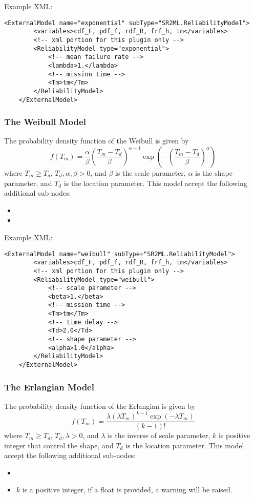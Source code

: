 Example XML:
\begin{lstlisting}[style=XML]
	<ExternalModel name="exponential" subType="SR2ML.ReliabilityModel">
		<variables>cdf_F, pdf_f, rdf_R, frf_h, tm</variables>
		<!-- xml portion for this plugin only -->
		<ReliabilityModel type="exponential">
			<!-- mean failure rate -->
			<lambda>1.</lambda>
			<!-- mission time -->
			<Tm>tm</Tm>
		</ReliabilityModel>
	</ExternalModel>
\end{lstlisting}

\subsubsection{The Weibull Model}
The probability density function of the Weibull is given by
\begin{equation}
	f(T_m) = \frac{\alpha}{\beta}\left(\frac{T_m-T_d}{\beta}\right)^{\alpha-1}\exp\left(-\left(\frac{T_m-T_d}{\beta}\right)^\alpha\right)
\end{equation}
where $T_m\geq T_d$, $T_d, \alpha, \beta >0$, and $\beta$ is the scale parameter, $\alpha$ is the shape
parameter, and $T_d$ is the location parameter.
This model accept the following additional sub-nodes:
\begin{itemize}
	\item {}
	\item {}
\end{itemize}

Example XML:
\begin{lstlisting}[style=XML]
	<ExternalModel name="weibull" subType="SR2ML.ReliabilityModel">
		<variables>cdf_F, pdf_f, rdf_R, frf_h, tm</variables>
		<!-- xml portion for this plugin only -->
		<ReliabilityModel type="weibull">
			<!-- scale parameter -->
			<beta>1.</beta>
			<!-- mission time -->
			<Tm>tm</Tm>
			<!-- time delay -->
			<Td>2.0</Td>
			<!-- shape parameter -->
			<alpha>1.0</alpha>
		</ReliabilityModel>
	</ExternalModel>
\end{lstlisting}

\subsubsection{The Erlangian Model}
The probability density function of the Erlangian is given by
\begin{equation}
	f(T_m) = \frac{\lambda\left(\lambda T_m\right)^{k-1}\exp\left(-\lambda T_m\right)}{\left(k-1\right)!}
\end{equation}
where $T_m\geq T_d$, $T_d, \lambda >0$, and $\lambda$ is the inverse of scale parameter, $k$ is positive integer
that control the shape, and $T_d$ is the location parameter.
This model accept the following additional sub-nodes:
\begin{itemize}
	\item {}
	\item {}
	\nb $k$ is a positive integer, if a float is provided, a warning will be raised.
\end{itemize}

